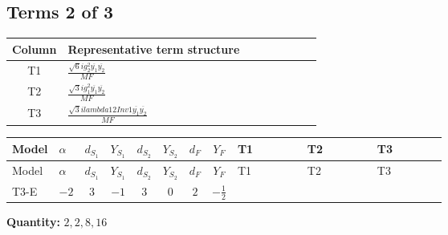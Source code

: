 \documentclass[8pt]{article}
\begin{document}
\begin{landscape}
\subsection*{Terms 2 of 3}
\begin{center}
\begin{tabular}{@{}c >{\raggedright\arraybackslash}p{0.82\linewidth}@{}}
\toprule
Column & Representative term structure \\
\midrule
T1 & \(\displaystyle \frac{\sqrt{6} i g_{2}^{2} \overline{y_{1}} \overline{y_{2}}}{MF}\) \\
\midrule
T2 & \(\displaystyle \frac{\sqrt{3} i g_{1}^{2} \overline{y_{1}} \overline{y_{2}}}{MF}\) \\
\midrule
T3 & \(\displaystyle \frac{\sqrt{3} i lambda12Inv1 \overline{y_{1}} \overline{y_{2}}}{MF}\) \\
\midrule
\bottomrule
\end{tabular}
\end{center}
\smallskip
\tiny
\begin{longtable}{@{}llcccccc >{\raggedright\arraybackslash}p{0.21\linewidth} >{\raggedright\arraybackslash}p{0.21\linewidth} >{\raggedright\arraybackslash}p{0.21\linewidth}@{}}
\toprule
Model & $\alpha$ & $d_{S_1}$ & $Y_{S_1}$ & $d_{S_2}$ & $Y_{S_2}$ & $d_F$ & $Y_F$ & T1 & T2 & T3 \\
\midrule
\endfirsthead
\toprule
Model & $\alpha$ & $d_{S_1}$ & $Y_{S_1}$ & $d_{S_2}$ & $Y_{S_2}$ & $d_F$ & $Y_F$ & T1 & T2 & T3 \\
\midrule
\endhead
T3-E & $-2$ & $3$ & $-1$ & $3$ & $0$ & $2$ & $-\frac{1}{2}$ & \scriptsize\adjustbox{max width=\linewidth}{$\begin{gathered} - \frac{\sqrt{6} i g_{2}^{2} \overline{y_{1}} \overline{y_{2}}}{3 MF}\end{gathered}$} & \scriptsize\adjustbox{max width=\linewidth}{$\begin{gathered} - \frac{\sqrt{3} i g_{1}^{2} \overline{y_{1}} \overline{y_{2}}}{8 MF}\end{gathered}$} & \scriptsize\adjustbox{max width=\linewidth}{$\begin{gathered} \frac{\sqrt{3} i lambda12Inv1 \overline{y_{1}} \overline{y_{2}}}{6 MF}\end{gathered}$} \\
\midrule
\bottomrule
\end{longtable}
\clearpage
\noindent\textbf{Quantity: }$\mathrm{2,2,8,16}$\par\smallskip

\end{landscape}
\end{document}
